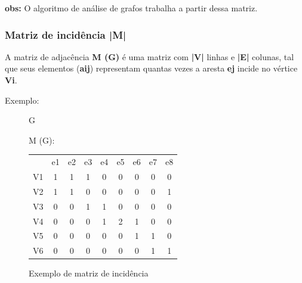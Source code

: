 \documentclass[a4paper, 12pt]{article}
\begin{document}
    \indent \textbf{obs:} O algoritmo de análise de grafos trabalha a partir dessa matriz.
    
\subsubsection{Matriz de incidência |M|}

    A matriz de adjacência \textbf{M (G) } é uma matriz com \textbf{|V|} linhas e \textbf{|E|} colunas, tal que seus elementos (\textbf{aij}) representam quantas vezes a aresta \textbf{ej} incide no vértice \textbf{Vi}.
    
    \vspace{0.5in}
    
    Exemplo:
    
    \begin{figure}[hbt!]
        \begin{multicols}{2}
            \begin{center}
            G\:
            \end{center}
            
            \begin{center}
            M (G):
            \end{center}
            \begin{tabular}{ccccccccc}
                & e1 & e2 & e3 & e4 & e5 & e6 & e7 & e8 \\
                V1 & 1  & 1  & 1  & 0  & 0  & 0  & 0  & 0  \\
                V2 & 1  & 1  & 0  & 0  & 0  & 0  & 0  & 1  \\
                V3 & 0  & 0  & 1  & 1  & 0  & 0  & 0  & 0  \\
                V4 & 0  & 0  & 0  & 1  & 2  & 1  & 0  & 0  \\
                V5 & 0  & 0  & 0  & 0  & 0  & 1  & 1  & 0  \\
                V6 & 0  & 0  & 0  & 0  & 0  & 0  & 1  & 1 
            \end{tabular}
        \end{multicols}
        \caption{Exemplo de matriz de incidência}
    \end{figure}
    
\end{document}
